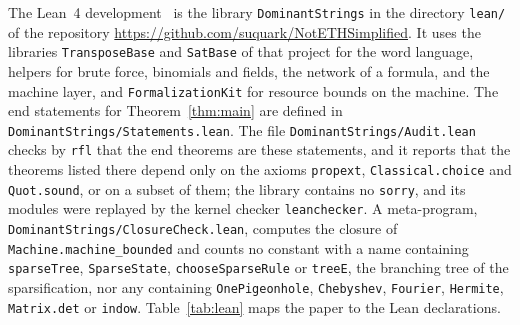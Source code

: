 \documentclass[11pt]{article}
\newcommand{\lean}[1]{\texttt{#1}}
\begin{document}
The Lean~4 development~\cite{Lean4,Mathlib} is the library \lean{DominantStrings} in the directory \texttt{lean/} of the repository \url{https://github.com/suquark/NotETHSimplified}. It uses the libraries \lean{TransposeBase} and \lean{SatBase} of that project for the word language, helpers for brute force, binomials and fields, the network of a formula, and the machine layer, and \lean{FormalizationKit} for resource bounds on the machine. The end statements for Theorem~\ref{thm:main} are defined in \lean{DominantStrings/Statements.lean}. The file \lean{DominantStrings/Audit.lean} checks by \lean{rfl} that the end theorems are these statements, and it reports that the theorems listed there depend only on the axioms \lean{propext}, \lean{Classical.choice} and \lean{Quot.sound}, or on a subset of them; the library contains no \lean{sorry}, and its modules were replayed by the kernel checker \lean{leanchecker}. A meta-program, \lean{DominantStrings/ClosureCheck.lean}, computes the closure of \lean{Machine.machine\_bounded} and counts no constant with a name containing \lean{sparseTree}, \lean{SparseState}, \lean{chooseSparseRule} or \lean{treeE}, the branching tree of the sparsification, nor any containing \lean{OnePigeonhole}, \lean{Chebyshev}, \lean{Fourier}, \lean{Hermite}, \lean{Matrix.det} or \lean{indow}. Table~\ref{tab:lean} maps the paper to the Lean declarations.
\end{document}
